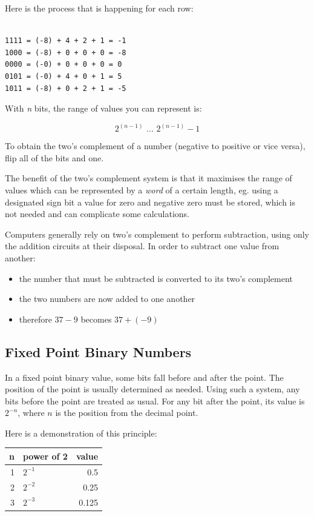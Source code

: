 \documentclass[9pt]{article}
\begin{document}
Here is the process that is happening for each row:

\begin{verbatim}

1111 = (-8) + 4 + 2 + 1 = -1
1000 = (-8) + 0 + 0 + 0 = -8
0000 = (-0) + 0 + 0 + 0 = 0
0101 = (-0) + 4 + 0 + 1 = 5
1011 = (-8) + 0 + 2 + 1 = -5

\end{verbatim}


With \emph{n} bits, the range of values you can represent is:

\[2^{(n-1)}  \text{ ... } 2^{(n-1)}  - 1\]

To obtain the two's complement of a number (negative to positive or vice versa), flip all of the bits and one.

The benefit of the two's complement system is that it maximises the range of values which can be represented by a \emph{word} of a certain length, eg. using a designated sign bit a value for zero and negative zero must be stored, which is not needed and can complicate some calculations.

Computers generally rely on two's complement to perform subtraction, using only the addition circuits at their disposal. In order to subtract one value from another:

\begin{itemize}
\item the number that must be subtracted is converted to its two's complement
\item the two numbers are now added to one another
\item therefore \(37 - 9\) becomes \(37 + (-9)\)
\end{itemize}

\subsection{Fixed Point Binary Numbers}
\label{sec:org83ea954}

In a fixed point binary value, some bits fall before and after the point. The position of the point is usually determined as needed. Using such a system, any bits before the point are treated as usual. For any bit after the point, its value is \(2^{-n}\), where \(n\) is the position from the decimal point.

Here is a demonstration of this principle:

\begin{center}
\begin{tabular}{rlr}
\hline
n & power of 2 & value\\
\hline
1 & \(2^{-1}\) & 0.5\\
2 & \(2^{-2}\) & 0.25\\
3 & \(2^{-3}\) & 0.125\\
\hline
\end{tabular}
\end{center}
\end{document}
